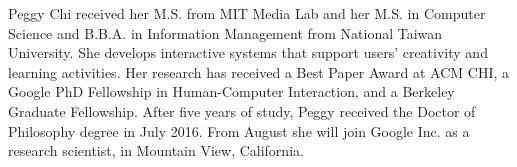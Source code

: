 \markboth{}{}

Peggy Chi received her M.S. from MIT Media Lab and her M.S. in Computer Science and B.B.A. in Information Management from National Taiwan University. She develops interactive systems that support users' creativity and learning activities. Her research has received a Best Paper Award at ACM CHI, a Google PhD Fellowship in Human-Computer Interaction, and a Berkeley Graduate Fellowship.
%
After five years of study, Peggy received the Doctor of Philosophy degree in July 2016. From August she will join Google Inc. as a research scientist, in Mountain View, California.


